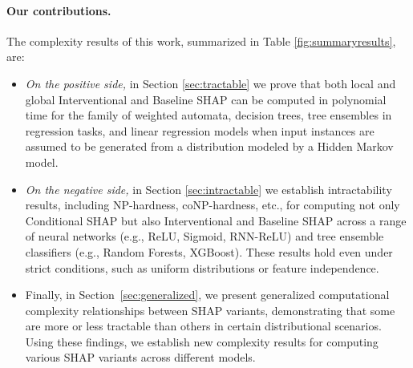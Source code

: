 \paragraph{Our contributions.} The complexity results of this work, summarized in Table \ref{fig:summaryresults}, are:


\begin{itemize}
    \item \emph{On the positive side,} in Section \ref{sec:tractable} we prove that both local and global Interventional and Baseline SHAP can be computed in polynomial time for the family of weighted automata, decision trees, tree ensembles in regression tasks, and linear regression models when input instances are assumed to be generated from a distribution modeled by a Hidden Markov model.
    \item \emph{On the negative side,} in Section \ref{sec:intractable} we establish intractability results, including NP-hardness, coNP-hardness, etc., for computing not only Conditional SHAP but also Interventional and Baseline SHAP across a range of neural networks (e.g., ReLU, Sigmoid, RNN-ReLU) and tree ensemble classifiers (e.g., Random Forests, XGBoost). These results hold even under strict conditions, such as uniform distributions or feature independence.
    \item Finally, in Section~\ref{sec:generalized}, we present generalized computational complexity relationships between SHAP variants, demonstrating that some are more or less tractable than others in certain distributional scenarios. Using these findings, we establish new complexity results for computing various SHAP variants across different models.
\end{itemize}


